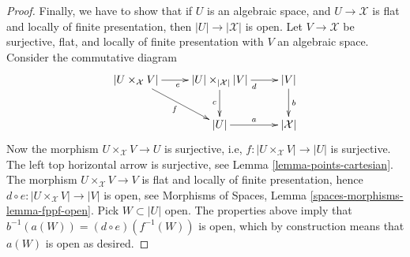 \begin{proof}
\medskip\noindent
Finally, we have to show that if $U$ is an algebraic space, and
$U \to \mathcal{X}$ is flat and locally of finite presentation, then
$|U| \to |\mathcal{X}|$ is open. Let $V \to \mathcal{X}$ be surjective,
flat, and locally of finite presentation with $V$ an algebraic space.
Consider the commutative diagram
$$
\xymatrix{
|U \times_{\mathcal{X}} V| \ar[r]_e \ar[rd]_f &
|U| \times_{|\mathcal{X}|} |V| \ar[d]_c \ar[r]_d &
|V| \ar[d]^b \\
& |U| \ar[r]^a & |\mathcal{X}|
}
$$
Now the morphism $U \times_{\mathcal{X}} V \to U$ is surjective, i.e,
$f : |U \times_{\mathcal{X}} V| \to |U|$ is surjective.
The left top horizontal arrow is surjective, see
Lemma \ref{lemma-points-cartesian}.
The morphism $U \times_{\mathcal{X}} V \to V$ is flat and locally of finite
presentation, hence $d \circ e : |U \times_{\mathcal{X}} V| \to |V|$ is open,
see
Morphisms of Spaces, Lemma \ref{spaces-morphisms-lemma-fppf-open}.
Pick $W \subset |U|$ open. The properties above imply that
$b^{-1}(a(W)) = (d \circ e)(f^{-1}(W))$ is open, which by construction means
that $a(W)$ is open as desired.
\end{proof}


















